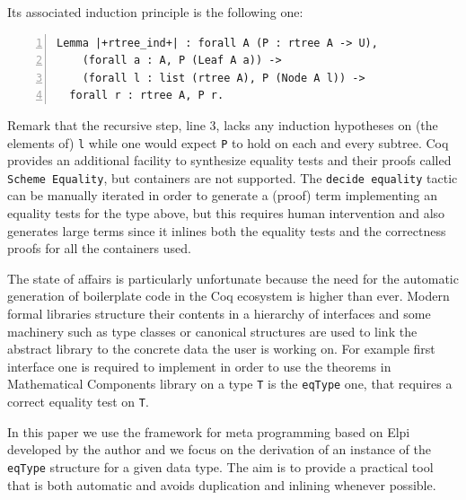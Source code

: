 \documentclass[sigplan,10pt,review]{acmart}\settopmatter{printfolios=true,printccs=false,printacmref=false}
\begin{document}
\noindent
Its associated induction principle is the following one:

\begin{minipage}{\textwidth}\begin{lstlisting}[numbers=left]
Lemma |+rtree_ind+| : forall A (P : rtree A -> U),
    (forall a : A, P (Leaf A a)) ->
    (forall l : list (rtree A), P (Node A l)) ->
  forall r : rtree A, P r.
\end{lstlisting}\end{minipage}

Remark that the recursive step, line 3, lacks any induction hypotheses
on (the elements of) \lstinline+l+ while one would expect
\lstinline+P+ to hold on each and every subtree.  Coq provides
an additional facility to synthesize equality tests and their proofs
called \lstinline+Scheme Equality+, but containers are not supported.
The \lstinline+decide equality+ tactic can be manually iterated in
order to generate a (proof) term implementing an equality tests for
the type above, but this requires human intervention and also
generates large terms since it inlines both the equality tests and the 
correctness proofs for all the containers used.

The state of affairs is particularly unfortunate because
the need for the automatic generation of boilerplate
code in the Coq ecosystem is higher than ever.
Modern formal libraries structure their contents in a
hierarchy of interfaces and some machinery such as type classes or
canonical structures are used to link the abstract library to the
concrete data the user is working on.  For example first interface one
is required to implement in order to use the theorems in Mathematical
Components library on a type \lstinline+T+ is the \lstinline+eqType+
one, that requires a correct equality test on \lstinline+T+.


In this paper we use the framework for meta programming based on Elpi
developed by the author and we focus on the derivation of an instance
of the
\lstinline+eqType+ structure for a given data type.
The aim is to provide a practical tool that is both automatic and
avoids duplication and inlining whenever possible.
\end{document}
